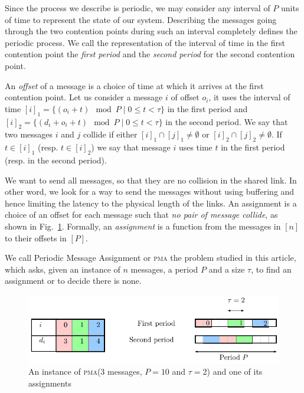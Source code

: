 \documentclass[a4paper,UKenglish,cleveref, autoref, thm-restate]{lipics-v2019}
\newcommand\pma{\textsc{pma}\xspace}
\begin{document}
Since the process we describe is periodic, we may consider any interval of $P$ units of time
to represent the state of our system. Describing the messages going through the two contention points during such an interval
completely defines the periodic process. We call the representation of the interval
of time in the first contention point the \emph{first period} and the \emph{second period}
for the second contention point.

An \emph{offset} of a message is a choice of time at which it arrives
at the first contention point. Let us consider a message $i$
of offset $o_i$, it uses the interval of time $[i]_1 = \{ (o_i + t) \mod P \mid 0 \leq t < \tau \}$ in the first period and $[i]_2 = \{ (d_i + o_i + t) \mod P \mid 0 \leq t < \tau \}$ in the second period. We say that two messages $i$ and $j$ collide if either $[i]_1 \cap [j]_1 \neq \emptyset $ or $[i]_2 \cap [j]_2 \neq \emptyset $. If $t \in [i]_1$ (resp. $t \in [i]_2$) we say that message $i$ uses time $t$ in the first period (resp. in the second period).

We want to send all messages, so that they are no collision in the shared link.
In other word, we look for a way to send the messages without using buffering and 
hence limiting the latency to the physical length of the links. An assignment is a
choice of an offset for each message such that \emph{no pair of message collide}, as shown in Fig.~\ref{fig:assignment}.
Formally, an \emph{assignment} is a function from the messages in $[n]$ to their offsets in $[P]$.  

We call Periodic Message Assignment or \pma the problem studied in this article,
which asks, given an instance of $n$ messages, a period $P$ and a size $\tau$, to find 
an assignment or to decide there is none.
\begin{figure}
\begin{center}
\includegraphics[scale=0.7]{instance}
\end{center}
\caption{An instance of \pma ($3$ messages, $P= 10$ and $\tau = 2$) and one of its assignments}
\label{fig:assignment}
\end{figure}
\end{document}
